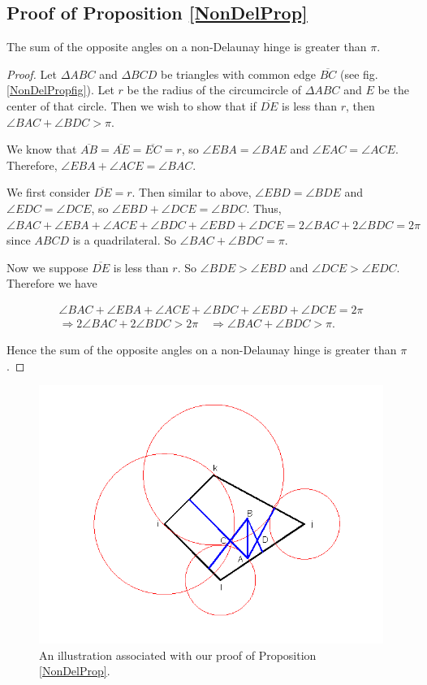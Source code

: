 \documentclass[12pt]{article}
\begin{document}
\subsection{Proof of Proposition \ref{NonDelProp}}
The sum of the opposite angles on a non-Delaunay hinge is greater than $\pi$.
\begin{proof}
\label{prop1}
Let $\Delta ABC$ and $\Delta BCD$ be triangles with common edge $\overline{BC}$ (see fig. \ref{NonDelPropfig}). Let $r$ be the radius of the circumcircle of  $\Delta ABC$ and $E$ be the center of that circle. Then we wish to show that if $\overline{DE}$ is less than $r$, then $\angle BAC + \angle BDC > \pi$.

We know that $\overline{AB}=\overline{AE}=\overline{EC}=r$, so $\angle EBA = \angle BAE$ and $\angle EAC = \angle ACE$. Therefore, $\angle EBA + \angle ACE= \angle BAC$.

We first consider $\overline{DE}=r$. Then similar to above, $\angle EBD = \angle BDE$ and $\angle EDC = \angle DCE$, so $\angle EBD + \angle DCE= \angle BDC$. Thus, $\angle BAC + \angle EBA + \angle ACE + \angle BDC + \angle EBD + \angle DCE = 2\angle BAC + 2\angle BDC = 2\pi$
since $ABCD$ is a quadrilateral. So $\angle BAC + \angle BDC = \pi$.

Now we suppose $\overline{DE}$ is less than $r$. So $\angle BDE > \angle EBD$ and $\angle DCE > \angle EDC$. Therefore we have

\begin{align*}
\angle BAC + \angle EBA + \angle ACE + \angle BDC + \angle EBD + \angle DCE = 2\pi \\
\Rightarrow 2\angle BAC + 2\angle BDC > 2\pi \quad \Rightarrow \angle BAC + \angle BDC > \pi.
\end{align*}

 Hence the sum of the opposite angles on a non-Delaunay hinge is greater than $\pi$. \qedhere
\end{proof}

\begin{figure}
\label{weidelpropfig}
\centering
\includegraphics[scale = 0.45]{Pictures/geometryW2.png}
\caption{An illustration associated with our proof of Proposition \ref{NonDelProp}.}
\end{figure}
\end{document}

